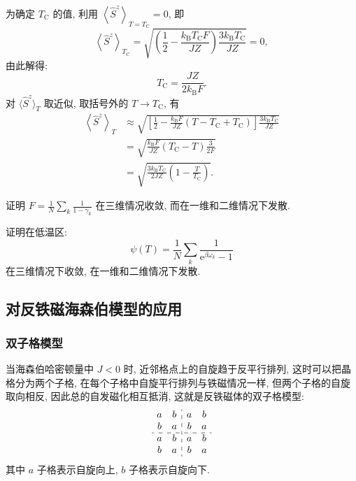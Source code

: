为确定 $T_{\mathrm{C}}$ 的值, 利用 $\left\langle \hat{S}^z \right\rangle_{T=T_{\mathrm{C}}}=0$, 即
\begin{equation}
    \left\langle \hat{S}^z \right\rangle_{T_{\mathrm{C}}}=\sqrt{\left( \frac{1}{2}-\frac{k_{\mathrm{B}}T_{\mathrm{C}}F}{JZ} \right)\frac{3k_{\mathrm{B}}T_{\mathrm{C}}}{JZ}}=0,
\end{equation}
由此解得:
\begin{equation}
    T_{\mathrm{C}}=\frac{JZ}{2k_{\mathrm{B}}F}.
\end{equation}
对 $\langle \hat{S}^z \rangle_T$ 取近似, 取括号外的 $T\to T_{\mathrm{C}}$, 有
 \begin{align}
        \left\langle \hat{S}^z \right\rangle_T&\approx\sqrt{\left[ \frac{1}{2}-\frac{k_{\mathrm{B}}F}{JZ}\left( T-T_{\mathrm{C}}+T_{\mathrm{C}} \right) \right]\frac{3k_{\mathrm{B}}T_{\mathrm{C}}}{JZ}}\nonumber\\
        &=\sqrt{\frac{k_{\mathrm{B}}F}{JZ}\left( T_{\mathrm{C}}-T \right)\frac{3}{2F}}\nonumber\\
        &=\sqrt{\frac{3k_{\mathrm{B}}T_{\mathrm{C}}}{2JZ}\left( 1-\frac{T}{T_{\mathrm{C}}} \right)}.
    \end{align}
\begin{question}{}{}
    证明 $\displaystyle F=\frac{1}{N}\sum_k\frac{1}{1-\gamma_k}$ 在三维情况收敛, 而在一维和二维情况下发散.
\end{question}
\begin{question}{}{}
    证明在低温区:
    \begin{equation}
        \psi(T)=\frac{1}{N}\sum_k\frac{1}{\mathrm{e}^{\beta\omega_k}-1}
    \end{equation}
    在三维情况下收敛, 在一维和二维情况下发散.
\end{question}

\subsection{对反铁磁海森伯模型的应用}
\subsubsection{双子格模型}
当海森伯哈密顿量中 $J<0$ 时, 近邻格点上的自旋趋于反平行排列, 这时可以把晶格分为两个子格, 在每个子格中自旋平行排列与铁磁情况一样, 但两个子格的自旋取向相反, 因此总的自发磁化相互抵消, 这就是反铁磁体的双子格模型:
$$
\begin{array}{cc:cc}
a&b&a&b\\
b&a&b&a\\
\hdashline 
a&b&a&b\\
b&a&b&a
\end{array}
$$
其中 $a$ 子格表示自旋向上, $b$ 子格表示自旋向下.

